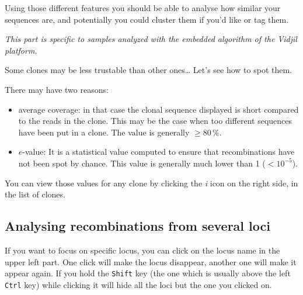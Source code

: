 \documentclass[10pt]{article}
\begin{document}
  
Using those different features you should be able to analyse how similar your
sequences are, and potentially you could cluster them if you'd like or tag them.


\bigskip

\textit{This part is specific to samples analyzed with the embedded algorithm of the Vidjil platform.}

Some clones may be less trustable than other ones\dots{} Let's see how to spot them.

There may have two reasons: 
\begin{itemize}
\item average coverage: in that case the clonal sequence displayed is short
  compared to the reads in the clone. This may be the case when too different
  sequences have been put in a clone. The value is generally $\geq 80\,\%$.
\item $e$-value: It is a statistical value computed to ensure that
  recombinations have not been spot by chance. This value is generally much
  lower than 1 ($<10^{-5}$).
\end{itemize}

You can view those values for any clone by clicking the \textit{i} icon on the
right side, in the list of clones.
\subsection{Analysing recombinations from several loci}

If you want to focus on specific locus, you can click on the locus name in
the upper left part. One click will make the locus disappear, another one will
make it appear again.
If you hold the \texttt{Shift} key (the one which is usually above the left
\texttt{Ctrl} key) while clicking it will hide all the loci but the one you
clicked on.



\end{document}
